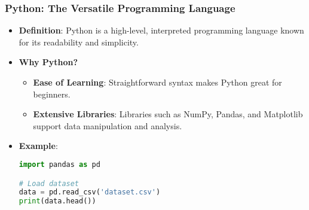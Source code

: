 \documentclass[aspectratio=169]{beamer}
\begin{document}
\begin{frame}[fragile]
    \frametitle{Python: The Versatile Programming Language}
    \begin{itemize}
        \item \textbf{Definition}: Python is a high-level, interpreted programming language known for its readability and simplicity.
        \item \textbf{Why Python?}
        \begin{itemize}
            \item \textbf{Ease of Learning}: Straightforward syntax makes Python great for beginners.
            \item \textbf{Extensive Libraries}: Libraries such as NumPy, Pandas, and Matplotlib support data manipulation and analysis.
        \end{itemize}
        \item \textbf{Example}:
        \begin{lstlisting}[language=Python]
import pandas as pd

# Load dataset
data = pd.read_csv('dataset.csv')
print(data.head())
        \end{lstlisting}
    \end{itemize}
\end{frame}
\end{document}
